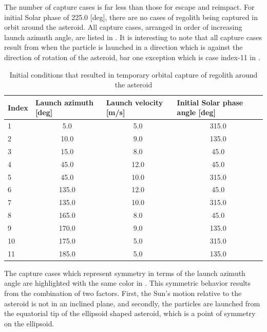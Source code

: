 The number of capture cases is far less than those for escape and reimpact. For initial Solar phase of 225.0 [deg], there are no cases of regolith being captured in orbit around the asteroid. All capture cases, arranged in order of increasing launch azimuth angle, are listed in . It is interesting to note that all capture cases result from when the particle is launched in a direction which is against the direction of rotation of the asteroid, bar one exception which is case index-11 in .
\begin{table}[htb]
\centering
\captionsetup{justification=centering}
\caption{Initial conditions that resulted in temporary orbital capture of regolith around the asteroid}
\label{tab:LoGSP_1_capture}
\begin{tabular}{|l|c|c|c|}
\hline
Index & \multicolumn{1}{l|}{Launch azimuth [deg]} & \multicolumn{1}{l|}{Launch velocity [m/s]} & \multicolumn{1}{l|}{Initial Solar phase angle [deg]} \\ \hline
\rowcolor[HTML]{FE996B}
1   & 5.0 & 5.0 & 315.0     \\ \hline
\rowcolor[HTML]{67FD9A}
2   & 10.0 & 9.0 & 135.0    \\ \hline
\rowcolor[HTML]{9698ED}
3   & 15.0 & 8.0 & 45.0     \\ \hline
\rowcolor[HTML]{FFCC67}
4   & 45.0 & 12.0 & 45.0    \\ \hline
\rowcolor[HTML]{96FFFB}
5   & 45.0 & 10.0 & 315.0   \\ \hline
\rowcolor[HTML]{FFCC67}
6   & 135.0 & 12.0 & 45.0   \\ \hline
\rowcolor[HTML]{96FFFB}
7   & 135.0 & 10.0 & 315.0  \\ \hline
\rowcolor[HTML]{9698ED}
8   & 165.0 & 8.0 & 45.0    \\ \hline
\rowcolor[HTML]{67FD9A}
9   & 170.0 & 9.0 & 135.0   \\ \hline
\rowcolor[HTML]{FE996B}
10  & 175.0 & 5.0 & 315.0   \\ \hline
11  & 185.0 & 5.0 & 135.0   \\ \hline
\end{tabular}
\end{table}
The capture cases which represent symmetry in terms of the launch azimuth angle are highlighted with the same color in . This symmetric behavior results from the combination of two factors. First, the Sun's motion relative to the asteroid is not in an inclined plane, and secondly, the particles are launched from the equatorial tip of the ellipsoid shaped asteroid, which is a point of symmetry on the ellipsoid.
